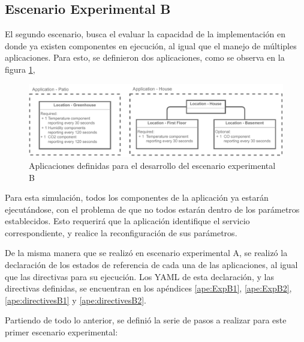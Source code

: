 \subsection{Escenario Experimental B} \label{sec:EscenarioExperimentalB}

El segundo escenario, busca el evaluar la capacidad de la implementación en donde ya existen componentes en ejecución, al igual que el manejo de múltiples aplicaciones. Para esto, se definieron dos aplicaciones, como se observa en la figura \ref{fig:ExpB}, 

\begin{figure}[H]
    \centering
    \caption{Aplicaciones definidas para el desarrollo del escenario experimental B}
    \label{fig:ExpB}
    \includegraphics[width=\linewidth]{images/ScenarioB.pdf}
    \vspace{-4mm}
\end{figure}

Para esta simulación, todos los componentes de la aplicación ya estarán ejecutándose, con el problema de que no todos estarán dentro de los parámetros establecidos. Esto requerirá que la aplicación identifique el servicio correspondiente, y realice la reconfiguración de sus parámetros.

De la misma manera que se realizó en escenario experimental A, se realizó la declaración de los estados de referencia de cada una de las aplicaciones, al igual que las directivas para su ejecución. Los YAML de esta declaración, y las directivas definidas, se encuentran en los apéndices \ref{ape:ExpB1}, \ref{ape:ExpB2}, \ref{ape:directivesB1} y \ref{ape:directivesB2}.

Partiendo de todo lo anterior, se definió la serie de pasos a realizar para este primer escenario experimental:

